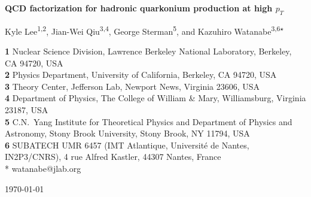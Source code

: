 \documentclass[Physsubmission, Phys]{SciPost}
\begin{document}
\begin{center}{\Large \textbf{
QCD factorization for hadronic quarkonium production at high $p_T$\\
}}\end{center}


\begin{center}
Kyle Lee\textsuperscript{1,2},
Jian-Wei Qiu\textsuperscript{3,4}, 
George Sterman\textsuperscript{5}, and
Kazuhiro Watanabe\textsuperscript{3,6$\star$}
\end{center}

\begin{center}
{\bf 1} Nuclear Science Division, Lawrence Berkeley National Laboratory, Berkeley, CA 94720, USA
\\
{\bf 2} Physics Department, University of California, Berkeley, CA 94720, USA
\\
{\bf 3} Theory Center, Jefferson Lab, Newport News, Virginia 23606, USA
\\
{\bf 4} Department of Physics, The College of William \& Mary, Williamsburg, Virginia 23187, USA
\\
{\bf 5} C.N.~Yang Institute for Theoretical Physics and Department of Physics and Astronomy, 
Stony Brook University, Stony Brook, NY 11794, USA
\\
{\bf 6} SUBATECH UMR 6457 (IMT Atlantique, Universit\'e de Nantes, IN2P3/CNRS), 4 rue Alfred Kastler, 44307 Nantes, France
\\
* watanabe@jlab.org
\end{center}

\begin{center}
\today
\end{center}

\end{document}
